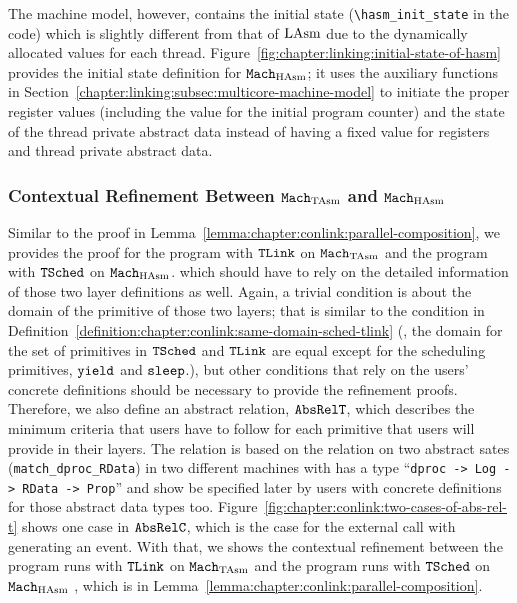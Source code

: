 The machine model, however, contains the initial state (\lstinline$\hasm_init_state$ in the code) 
which is slightly different from that of $\mathrm{LAsm}$ due to the dynamically allocated values for each thread.
Figure~\ref{fig:chapter:linking:initial-state-of-hasm} provides 
the initial state definition for ${\mathrm{\texttt{Mach}}}_{\mathrm{HAsm}}$;
it uses the auxiliary functions in Section~\ref{chapter:linking:subsec:multicore-machine-model} to
initiate the proper register values (including the value for the initial program counter) and the state of the thread private abstract data instead of having a fixed value for registers and thread private abstract data.
 
\subsubsection{Contextual Refinement Between ${\mathrm{\texttt{Mach}}}_{\mathrm{TAsm}}$ and ${\mathrm{\texttt{Mach}}}_{\mathrm{HAsm}}$}
 
 
Similar to the proof in Lemma~\ref{lemma:chapter:conlink:parallel-composition}, 
we provides the proof for the program with ${{\mathrm{\texttt{TLink}}}}$ on ${\mathrm{\texttt{Mach}}}_{\mathrm{TAsm}}$ and the program with ${{\mathrm{\texttt{TSched}}}}$ on ${\mathrm{\texttt{Mach}}}_{\mathrm{HAsm}}$.
which should have to rely on the detailed information of those two layer definitions as well. 
Again, a trivial condition is about the domain of the primitive of those two layers; that is similar to the condition in Definition~\ref{definition:chapter:conlink:same-domain-sched-tlink}
(\ie, the domain for the set of primitives in ${{\mathrm{\texttt{TSched}}}}$ and ${{\mathrm{\texttt{TLink}}}}$ are equal except for the scheduling primitives, ${\mathrm{\texttt{yield}}}$ and ${\mathrm{\texttt{sleep}}}$.),
but other conditions that rely on the users' concrete definitions
should be necessary to provide the refinement proofs.
Therefore, we also define an abstract relation, ${{\mathrm{\texttt{AbsRelT}}}}$,
which describes the minimum criteria that users have to follow for each primitive that users will provide in their layers.
The relation is based on the relation on two abstract sates (\lstinline$match_dproc_RData$) in two different machines with has a
type ``\lstinline$dproc -> Log -> RData -> Prop$'' and show be specified later by users with  concrete definitions for those abstract data types too. Figure~\ref{fig:chapter:conlink:two-cases-of-abs-rel-t} shows 
one case in  ${{\mathrm{\texttt{AbsRelC}}}}$, which is the case 
for the external call with generating an event. 
With that, we shows the contextual refinement between the program runs with ${{\mathrm{\texttt{TLink}}}}$ on ${\mathrm{\texttt{Mach}}}_{\mathrm{TAsm}}$ and the program runs with ${{\mathrm{\texttt{TSched}}}}$ on ${\mathrm{\texttt{Mach}}}_{\mathrm{HAsm}}$ , which is in Lemma~\ref{lemma:chapter:conlink:parallel-composition}. 

